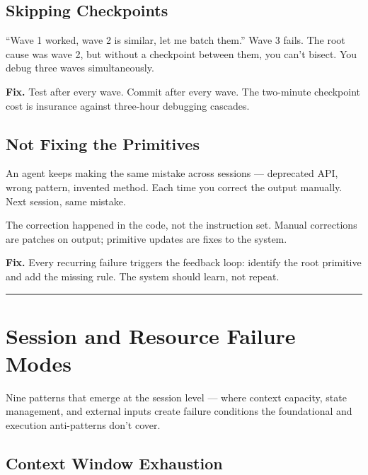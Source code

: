 \documentclass[
  a4paper,
  DIV=11,
  numbers=noendperiod]{scrreprt}
\begin{document}
\subsection{Skipping Checkpoints}\label{skipping-checkpoints}

``Wave 1 worked, wave 2 is similar, let me batch them.'' Wave 3 fails.
The root cause was wave 2, but without a checkpoint between them, you
can't bisect. You debug three waves simultaneously.

\textbf{Fix.} Test after every wave. Commit after every wave. The
two-minute checkpoint cost is insurance against three-hour debugging
cascades.

\subsection{Not Fixing the Primitives}\label{not-fixing-the-primitives}

An agent keeps making the same mistake across sessions --- deprecated
API, wrong pattern, invented method. Each time you correct the output
manually. Next session, same mistake.

The correction happened in the code, not the instruction set. Manual
corrections are patches on output; primitive updates are fixes to the
system.

\textbf{Fix.} Every recurring failure triggers the feedback loop:
identify the root primitive and add the missing rule. The system should
learn, not repeat.

\begin{center}\rule{0.5\linewidth}{0.5pt}\end{center}

\section{Session and Resource Failure
Modes}\label{session-and-resource-failure-modes}

Nine patterns that emerge at the session level --- where context
capacity, state management, and external inputs create failure
conditions the foundational and execution anti-patterns don't cover.

\subsection{Context Window Exhaustion}\label{context-window-exhaustion}
\end{document}
